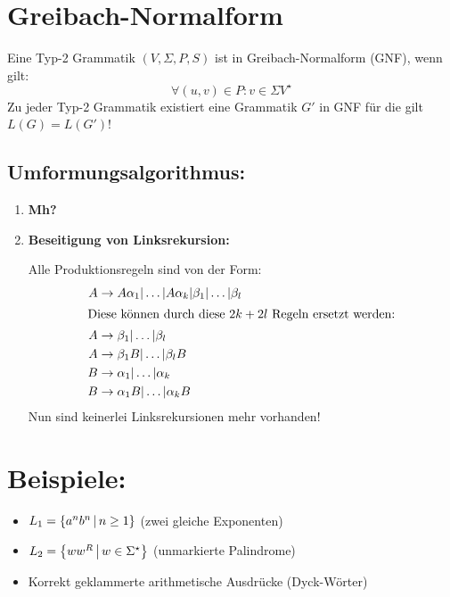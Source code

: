 \section{Greibach-Normalform}
Eine Typ-2 Grammatik $(V,\Sigma,P,S)$ ist in Greibach-Normalform (GNF),  wenn gilt:
\begin{equation*}
	\forall (u,v)\in P: v\in \Sigma V^\star
\end{equation*}
Zu jeder Typ-2 Grammatik existiert eine Grammatik $G'$ in GNF für die gilt $L(G)=L(G')$!
\subsection{Umformungsalgorithmus:}
\begin{enumerate}
	\item \textbf{Mh?}

	\item \textbf{Beseitigung von Linksrekursion:}

	Alle Produktionsregeln sind von der Form:
	\begin{align*}
		A&\rightarrow A\alpha_1|\ldots|A\alpha_k|\beta_1|\ldots|\beta_l\\
		\intertext{Diese können durch diese $2k+2l$ Regeln ersetzt werden:}
		A&\rightarrow \beta_1|\ldots|\beta_l\\
		A&\rightarrow \beta_1B|\ldots|\beta_lB\\
		B&\rightarrow \alpha_1|\ldots|\alpha_k\\
		B&\rightarrow \alpha_1B|\ldots|\alpha_kB
	\end{align*}%
	Nun sind keinerlei Linksrekursionen mehr vorhanden!
\end{enumerate}

\section{Beispiele: }
\begin{itemize}
	\item $L_1=\left\{ a^nb^n \,\middle|\, n\geq 1 \right\}$ (zwei gleiche Exponenten)
	\item $L_2=\left\{ ww^R \,\middle|\, w\in\Sigma^\star \right\}$ (unmarkierte Palindrome)
	\item Korrekt geklammerte arithmetische Ausdrücke (Dyck-Wörter)
\end{itemize}
